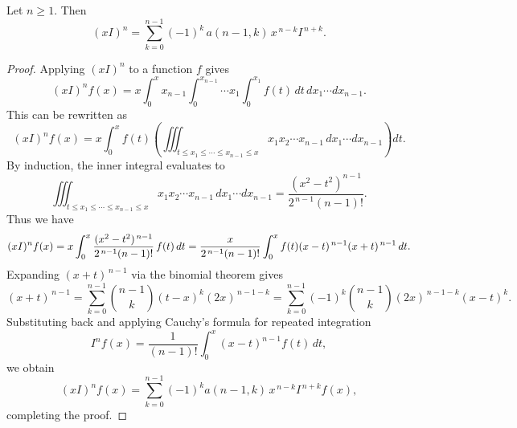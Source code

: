 \documentclass[10pt,a4paper]{amsart}
\begin{document}
\begin{theorem}\label{th}
Let \(n\ge1\). Then
\begin{equation}\label{000}
(xI)^n = \sum_{k=0}^{n-1} (-1)^k\, a(n-1,k)\, x^{\,n-k} I^{\,n+k}.
\end{equation}
\end{theorem}

\begin{proof}
Applying \((xI)^n\) to a function \(f\) gives 
\[
(xI)^n f(x) = x \int_0^x x_{n-1} \int_0^{x_{n-1}} \cdots x_1 \int_0^{x_1} f(t)\, dt \, dx_1 \cdots dx_{n-1}.
\]
This can be rewritten as
\[
(xI)^n f(x) = x \int_0^x f(t) 
\left( \iiint_{t \le x_1 \le \cdots \le x_{n-1} \le x} x_1 x_2 \cdots x_{n-1} \, dx_1 \cdots dx_{n-1} \right) dt.
\]
By induction, the inner integral evaluates to
\[
\iiint_{t \le x_1 \le \cdots \le x_{n-1} \le x} x_1 x_2 \cdots x_{n-1} \, dx_1 \cdots dx_{n-1} = \frac{(x^2 - t^2)^{n-1}}{2^{\,n-1}(n-1)!}.
\]
Thus we have
\[
(xI)^n f(x) = x \int_0^x \frac{(x^2 - t^2)^{\,n-1}}{2^{\,n-1}(n-1)!}\,f(t) \, dt \\
= \frac{x}{2^{\,n-1}(n-1)!} \int_0^x f(t) (x-t)^{\,n-1} (x+t)^{\,n-1} \, dt.    
\]
Expanding \((x+t)^{\,n-1}\) via the binomial theorem gives
\[
(x+t)^{\,n-1} = \sum_{k=0}^{n-1} \binom{n-1}{k} (t-x)^k (2x)^{\,n-1-k} = \sum_{k=0}^{n-1} (-1)^k \binom{n-1}{k} (2x)^{\,n-1-k} (x-t)^k.
\]
Substituting back and applying Cauchy's formula for repeated integration
\[
I^nf(x)=\frac{1}{(n-1)!}\int_0^x(x-t)^{n-1}f(t)\,dt,
\]
we obtain
\[
(xI)^n f(x) = \sum_{k=0}^{n-1} (-1)^k a(n-1,k)\, x^{\,n-k} I^{\,n+k} f(x),
\]
completing the proof.
\end{proof}
\end{document}
